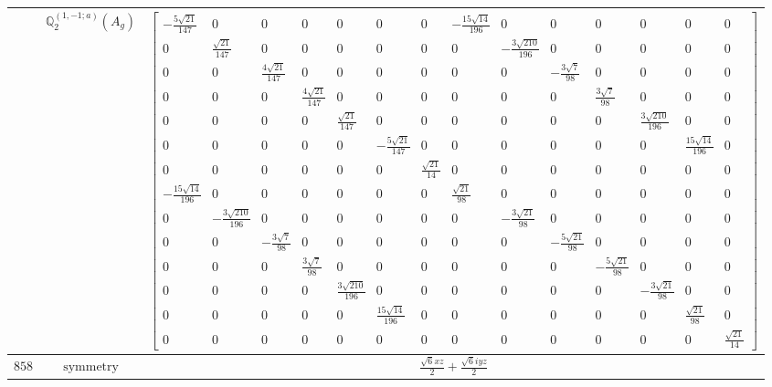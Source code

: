 \documentclass[fleqn,8pt,landscape]{jsarticle}
\begin{document}
\begin{longtable}{ccc}
$  $ & $ \mathbb{Q}_{2}^{(1,-1;a)}(A_{g}) $ & $ \begin{bmatrix} - \frac{5 \sqrt{21}}{147} & 0 & 0 & 0 & 0 & 0 & 0 & - \frac{15 \sqrt{14}}{196} & 0 & 0 & 0 & 0 & 0 & 0 \\ 0 & \frac{\sqrt{21}}{147} & 0 & 0 & 0 & 0 & 0 & 0 & - \frac{3 \sqrt{210}}{196} & 0 & 0 & 0 & 0 & 0 \\ 0 & 0 & \frac{4 \sqrt{21}}{147} & 0 & 0 & 0 & 0 & 0 & 0 & - \frac{3 \sqrt{7}}{98} & 0 & 0 & 0 & 0 \\ 0 & 0 & 0 & \frac{4 \sqrt{21}}{147} & 0 & 0 & 0 & 0 & 0 & 0 & \frac{3 \sqrt{7}}{98} & 0 & 0 & 0 \\ 0 & 0 & 0 & 0 & \frac{\sqrt{21}}{147} & 0 & 0 & 0 & 0 & 0 & 0 & \frac{3 \sqrt{210}}{196} & 0 & 0 \\ 0 & 0 & 0 & 0 & 0 & - \frac{5 \sqrt{21}}{147} & 0 & 0 & 0 & 0 & 0 & 0 & \frac{15 \sqrt{14}}{196} & 0 \\ 0 & 0 & 0 & 0 & 0 & 0 & \frac{\sqrt{21}}{14} & 0 & 0 & 0 & 0 & 0 & 0 & 0 \\ - \frac{15 \sqrt{14}}{196} & 0 & 0 & 0 & 0 & 0 & 0 & \frac{\sqrt{21}}{98} & 0 & 0 & 0 & 0 & 0 & 0 \\ 0 & - \frac{3 \sqrt{210}}{196} & 0 & 0 & 0 & 0 & 0 & 0 & - \frac{3 \sqrt{21}}{98} & 0 & 0 & 0 & 0 & 0 \\ 0 & 0 & - \frac{3 \sqrt{7}}{98} & 0 & 0 & 0 & 0 & 0 & 0 & - \frac{5 \sqrt{21}}{98} & 0 & 0 & 0 & 0 \\ 0 & 0 & 0 & \frac{3 \sqrt{7}}{98} & 0 & 0 & 0 & 0 & 0 & 0 & - \frac{5 \sqrt{21}}{98} & 0 & 0 & 0 \\ 0 & 0 & 0 & 0 & \frac{3 \sqrt{210}}{196} & 0 & 0 & 0 & 0 & 0 & 0 & - \frac{3 \sqrt{21}}{98} & 0 & 0 \\ 0 & 0 & 0 & 0 & 0 & \frac{15 \sqrt{14}}{196} & 0 & 0 & 0 & 0 & 0 & 0 & \frac{\sqrt{21}}{98} & 0 \\ 0 & 0 & 0 & 0 & 0 & 0 & 0 & 0 & 0 & 0 & 0 & 0 & 0 & \frac{\sqrt{21}}{14} \end{bmatrix} $ \\ \hline
$ 858 $ & $ \text{symmetry} $ & $ \frac{\sqrt{6} x z}{2} + \frac{\sqrt{6} i y z}{2} $ \\

\end{longtable}
\end{document}
